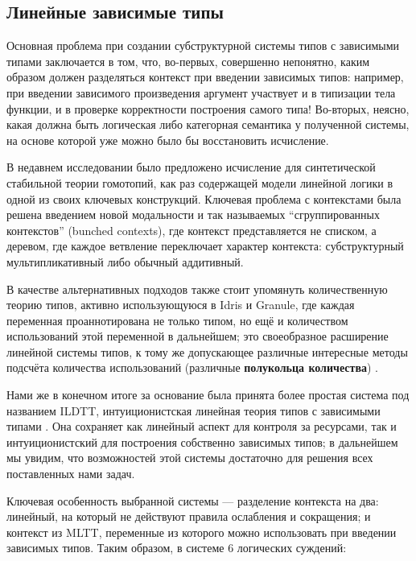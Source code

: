 \documentclass[12pt]{article}
\begin{document}
\subsection{Линейные зависимые типы}

Основная проблема при создании субструктурной системы типов с зависимыми типами
заключается в том, что, во-первых, совершенно непонятно, каким образом должен
разделяться контекст при введении зависимых типов: например, при введении
зависимого произведения аргумент участвует и в типизации тела функции, и в
проверке корректности построения самого типа! Во-вторых, неясно, какая должна
быть логическая либо категорная семантика у полученной системы, на основе
которой уже можно было бы восстановить исчисление.

В недавнем исследовании \cite{riley} было предложено исчисление для
синтетической стабильной теории гомотопий, как раз содержащей модели линейной
логики в одной из своих ключевых конструкций. Ключевая проблема с контекстами
была решена введением новой модальности и так называемых ``сгруппированных
контекстов'' (bunched contexts), где контекст представляется не списком, а
деревом, где каждое ветвление переключает характер контекста: субструктурный
мультипликативный либо обычный аддитивный.

В качестве альтернативных подходов также стоит упомянуть количественную теорию
типов, активно использующуюся в Idris и Granule, где каждая переменная
проаннотирована не только типом, но ещё и количеством использований этой
переменной в дальнейшем; это своеобразное расширение линейной системы типов, к
тому же допускающее различные интересные методы подсчёта количества
использований (различные \textbf{полукольца количества}) \cite{plenty}.

Нами же в конечном итоге за основание была принята более простая система
под названием ILDTT, интуиционистская линейная теория типов с зависимыми типами
\cite{vakar}. Она сохраняет как линейный аспект для контроля за ресурсами, так и
интуиционистский для построения собственно зависимых типов; в дальнейшем мы
увидим, что возможностей этой системы достаточно для решения всех поставленных
нами задач.

Ключевая особенность выбранной системы --- разделение контекста на два:
линейный, на который не действуют правила ослабления и сокращения; и
контекст из MLTT, переменные из которого можно использовать при введении
зависимых типов. Таким образом, в системе 6 логических суждений:
\end{document}
